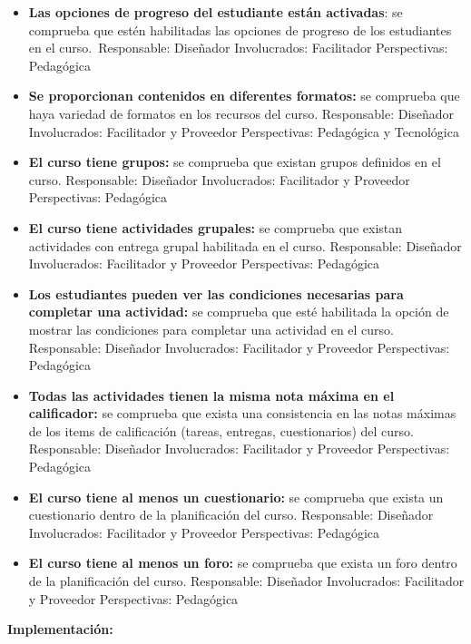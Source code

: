 \begin{itemize}
	\item
	\textbf{Las opciones de progreso del estudiante están activadas}: se
	comprueba que estén habilitadas las opciones de progreso de los
	estudiantes en el curso.~{Responsable:} Diseñador
	{Involucrados:} Facilitador {Perspectivas:} Pedagógica
	\item
	\textbf{Se proporcionan contenidos en diferentes formatos:} se
	comprueba que haya variedad de formatos en los recursos del curso.
	{Responsable:} Diseñador {Involucrados:} Facilitador y
	Proveedor {Perspectivas:} Pedagógica y Tecnológica
	\item
	\textbf{El curso tiene grupos:} se comprueba que existan grupos
	definidos en el curso. {Responsable:} Diseñador
	{Involucrados:} Facilitador y Proveedor {Perspectivas:}
	Pedagógica
	\item
	\textbf{El curso tiene actividades grupales:} se comprueba que existan
	actividades con entrega grupal habilitada en el curso.
	{Responsable:} Diseñador {Involucrados:} Facilitador y
	Proveedor {Perspectivas:} Pedagógica
	\item
	\textbf{Los estudiantes pueden ver las condiciones necesarias para
		completar una actividad:} se comprueba que esté habilitada la opción
	de mostrar las condiciones para completar una actividad en el curso.
	{Responsable:} Diseñador {Involucrados:} Facilitador y
	Proveedor {Perspectivas:} Pedagógica
	\item
	\textbf{Todas las actividades tienen la misma nota máxima en el
		calificador:} se comprueba que exista una consistencia en las notas
	máximas de los items de calificación (tareas, entregas, cuestionarios)
	del curso. {Responsable:} Diseñador {Involucrados:}
	Facilitador y Proveedor {Perspectivas:} Pedagógica
	\item
	\textbf{El curso tiene al menos un cuestionario:} se comprueba que exista un cuestionario dentro de la planificación del curso.
    {Responsable:} Diseñador {Involucrados:} Facilitador y Proveedor {Perspectivas:} Pedagógica
	\item
	\textbf{El curso tiene al menos un foro:} se comprueba que exista un foro dentro de la planificación del curso.
    {Responsable:} Diseñador {Involucrados:} Facilitador y Proveedor {Perspectivas:} Pedagógica
\end{itemize}

\textbf{Implementación:}

